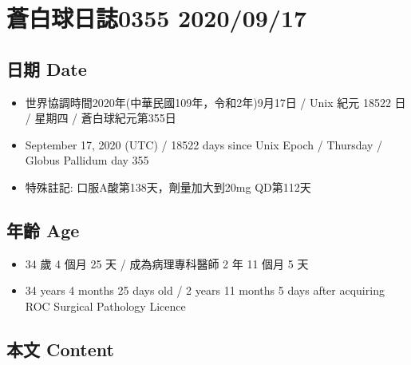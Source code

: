 \documentclass[
]{article}
\providecommand{\tightlist}{%
  \setlength{\itemsep}{0pt}\setlength{\parskip}{0pt}}
\begin{document}
\hypertarget{ux84bcux767dux7403ux65e5ux8a8c0355-20200917}{%
\section{蒼白球日誌0355
2020/09/17}\label{ux84bcux767dux7403ux65e5ux8a8c0355-20200917}}

\hypertarget{ux65e5ux671f-date-16}{%
\subsection{日期 Date}\label{ux65e5ux671f-date-16}}

\begin{itemize}
\tightlist
\item
  世界協調時間2020年(中華民國109年，令和2年)9月17日 / Unix 紀元 18522 日
  / 星期四 / 蒼白球紀元第355日
\item
  September 17, 2020 (UTC) / 18522 days since Unix Epoch / Thursday /
  Globus Pallidum day 355
\item
  特殊註記: 口服A酸第138天，劑量加大到20mg QD第112天
\end{itemize}

\hypertarget{ux5e74ux9f61-age-16}{%
\subsection{年齡 Age}\label{ux5e74ux9f61-age-16}}

\begin{itemize}
\tightlist
\item
  34 歲 4 個月 25 天 / 成為病理專科醫師 2 年 11 個月 5 天
\item
  34 years 4 months 25 days old / 2 years 11 months 5 days after
  acquiring ROC Surgical Pathology Licence
\end{itemize}

\hypertarget{ux672cux6587-content-16}{%
\subsection{本文 Content}\label{ux672cux6587-content-16}}
\end{document}
